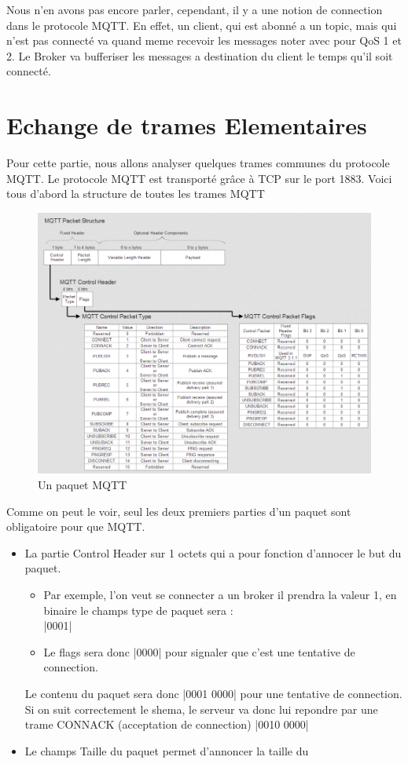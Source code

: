 \documentclass[a4paper,10pt]{article}
\begin{document}
Nous n'en avons pas encore parler, cependant, il y a une notion de connection dans le protocole MQTT. En effet, un client, qui est abonné a un topic, mais qui n'est pas connecté va quand meme recevoir les messages noter avec pour QoS 1 et 2. Le Broker va bufferiser les messages a destination du client le temps qu'il soit connecté.


\section{Echange de trames Elementaires}

Pour cette partie, nous allons analyser quelques trames  communes du protocole MQTT. Le protocole MQTT est transporté grâce à TCP sur le port 1883.
 Voici tous d'abord la structure de toutes les trames MQTT

\begin{figure}[h!]
\centering
\includegraphics[scale=0.350]{paquet.jpg}
\caption{Un paquet MQTT}
\label{fig:paquet}
\end{figure}
Comme on peut le voir, seul les deux premiers parties d'un paquet sont obligatoire pour que MQTT.
\begin{itemize}
 \item La partie Control Header sur 1 octets qui a pour fonction d'annocer le but du paquet.\\
 \begin{itemize}
            \item Par exemple, l'on veut se connecter a un broker il  prendra la valeur 1, en binaire le champs type de paquet  sera :\\
                    |0001|
            \item Le flags sera donc |0000| pour signaler que c'est une tentative de connection.
 \end{itemize}
Le contenu du paquet sera donc |0001 0000| pour une tentative de connection.
Si on suit correctement le shema, le serveur va donc lui repondre par une trame CONNACK (acceptation de connection) |0010 0000|

\item Le champs Taille du paquet permet d'annoncer la taille du 
\end{itemize}
\end{document}
